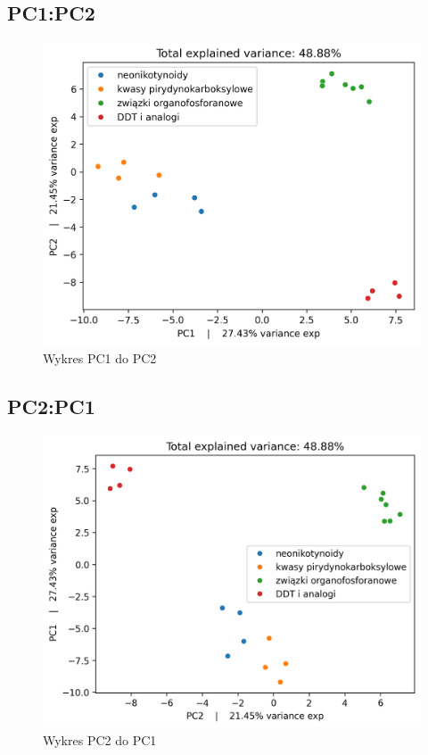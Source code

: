 \documentclass[12pt, a4paper]{article}
\begin{document}
    \subsection*{PC1:PC2}
        \begin{figure}[H]
            \centering
            \includegraphics{12.png}
            \caption{Wykres PC1 do PC2}
        \end{figure}

    \subsection*{PC2:PC1}
        \begin{figure}[H]
            \centering
            \includegraphics{21.png}
            \caption{Wykres PC2 do PC1}
        \end{figure}
\end{document}
